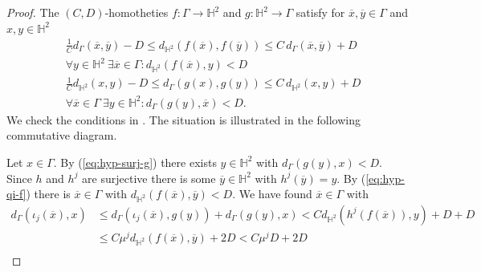 \documentclass{amsart}
\theoremstyle{definition}
\theoremstyle{remark}
\theoremstyle{remark}
\theoremstyle{definition}
\renewcommand{\leq}{\leqslant}
\begin{document}
\begin{proof}
The $(C,D)$-homotheties $f\colon \Gamma \to \mathbb{H}^2$ and $g \colon \mathbb{H}^2 \to \Gamma$ satisfy for $\overline{x}, \overline{y} \in \Gamma$ and $x,y \in \mathbb{H}^2$
\setcounter{equation}{0}
\begin{align}
& \frac{1}{C}d_{\Gamma}(\overline{x},\overline{y}) - D  \leq d_{\mathbb{H}^2}(f(\overline{x}), f(\overline{y}) )  \leq C \, d_{\Gamma}(\overline{x},\overline{y})  + D \label{eq:hyp-qi-f}\\
		&\forall y \in \mathbb{H}^2 \ \exists \overline{x} \in {\Gamma} \colon d_{\mathbb{H}^2}(f(\overline{x}),y) < D \label{eq:hyp-surj-f}\\
    &\frac{1}{C}d_{\mathbb{H}^2}(x,y) - D  \leq d_{\Gamma}(g(x),g(y) )  \leq C \, d_{\mathbb{H}^2}(x,y) + D \label{eq:hyp-qi-g} \\
		&\forall \overline x \in {\Gamma} \ \exists  y \in \mathbb{H}^2   \colon d_{\Gamma}(g(y),\overline x) < D . \label{eq:hyp-surj-g}
\end{align}
We check the conditions in . The situation is illustrated in the following commutative diagram.
\begin{center}
\end{center}
Let $x \in {\Gamma}$. By (\ref{eq:hyp-surj-g}) there exists $y \in \mathbb{H}^2$ with $d_{\Gamma}(g(y),x) < D$. Since $h$ and $h^j$ are surjective there is some $\overline{y}\in \mathbb{H}^2$ with $h^j(\overline{y}) = y$. By (\ref{eq:hyp-qi-f}) there is $\overline{x} \in {\Gamma}$ with $d_{\mathbb{H}^2}(f(\overline{x}), \overline{y}) < D$. We have found $\overline{x }\in {\Gamma}$ with
\begin{align*}
    d_{\Gamma}(\iota_j(\overline{x}) ,x ) &\leq d_{\Gamma}(\iota_j(\overline{x}), g(y)) + d_{\Gamma}(g(y),x) < C d_{\mathbb{H}^2}(h^j(f(\overline{x})), y) + D + D \\
    &\leq C \mu^j d_{\mathbb{H}^2}(f(\overline{x}), \overline{y}) + 2D < C \mu^j D + 2D \\

\end{align*}
\end{proof}
\end{document}
